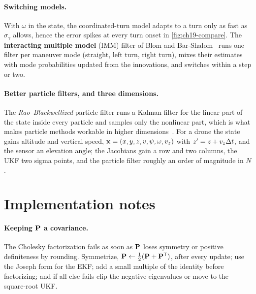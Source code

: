 \paragraph{Switching models.}
With $\omega$ in the state, the coordinated-turn model adapts to a turn only
as fast as $\sigma_\gamma$ allows, hence the error spikes at every turn
onset in \cref{fig:ch19-compare}. The \textbf{interacting multiple
model} (IMM) filter of Blom and
Bar-Shalom~\cite{blom1988imm,barshalom2001estimation} runs one filter per
maneuver mode (straight, left turn, right turn), mixes their estimates with
mode probabilities updated from the innovations, and switches within a step
or two.

\paragraph{Better particle filters, and three dimensions.}
The \emph{Rao--Blackwellized} particle filter runs a Kalman
filter for the linear part of the state inside every particle and samples
only the nonlinear part, which is what makes particle methods workable in
higher dimensions~\cite{doucet2001sequential,arulampalam2002tutorial}. For a
drone the state gains altitude and vertical speed, $\mathbf{x} = (x, y, z, v,
\psi, \omega, v_z)$ with $z' = z + v_z\Delta t$, and the sensor an elevation
angle; the Jacobians gain a row and two columns, the UKF two sigma points,
and the particle filter roughly an order of magnitude in $N$.

\section{Implementation notes}
\label{sec:ch19-implementation}

\paragraph{Keeping $\mathbf{P}$ a covariance.}
The Cholesky factorization fails as soon as $\mathbf{P}$ loses symmetry or
positive definiteness by rounding. Symmetrize, $\mathbf{P} \gets
\frac12(\mathbf{P} + \mathbf{P}^{\mathsf{T}})$, after every update; use the Joseph form for
the EKF; add a small multiple of the identity before factorizing; and if all
else fails clip the negative eigenvalues or move to the square-root UKF.

